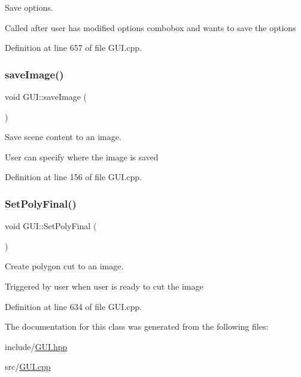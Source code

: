 Save options. 

Called after user has modified options combobox and wants to save the options 

Definition at line 657 of file G\+U\+I.\+cpp.

\mbox{\label{classGUI_a44684af7706c021022520e2c4829c3ee}} 
\subsubsection{\texorpdfstring{save\+Image()}{saveImage()}}
{\footnotesize\ttfamily void G\+U\+I\+::save\+Image (\begin{DoxyParamCaption}{ }\end{DoxyParamCaption})}



Save scene content to an image. 

User can specify where the image is saved 

Definition at line 156 of file G\+U\+I.\+cpp.

\mbox{\label{classGUI_a6bf2d3ef382340365b5693245a2bd955}} 
\subsubsection{\texorpdfstring{Set\+Poly\+Final()}{SetPolyFinal()}}
{\footnotesize\ttfamily void G\+U\+I\+::\+Set\+Poly\+Final (\begin{DoxyParamCaption}{ }\end{DoxyParamCaption})}



Create polygon cut to an image. 

Triggered by user when user is ready to cut the image 

Definition at line 634 of file G\+U\+I.\+cpp.



The documentation for this class was generated from the following files\+:\begin{DoxyCompactItemize}
\item 
include/\mbox{\hyperlink{GUI_8hpp}{G\+U\+I.\+hpp}}\item 
src/\mbox{\hyperlink{GUI_8cpp}{G\+U\+I.\+cpp}}\end{DoxyCompactItemize}
